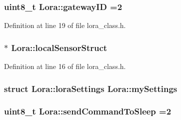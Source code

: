 \subsubsection[{\texorpdfstring{gateway\+ID}{gatewayID}}]{\setlength{\rightskip}{0pt plus 5cm}uint8\+\_\+t Lora\+::gateway\+ID =2\hspace{0.3cm}{\ttfamily [private]}}\hypertarget{class_lora_a47c7dd9636e2680b188e6b475602a049}{}\label{class_lora_a47c7dd9636e2680b188e6b475602a049}


Definition at line 19 of file lora\+\_\+class.\+h.

\subsubsection[{\texorpdfstring{local\+Sensor\+Struct}{localSensorStruct}}]{$\ast$ Lora\+::local\+Sensor\+Struct\hspace{0.3cm}{\ttfamily [private]}}\hypertarget{class_lora_a699a6c2d05a24bb1dd2994b82e9e8a33}{}\label{class_lora_a699a6c2d05a24bb1dd2994b82e9e8a33}


Definition at line 16 of file lora\+\_\+class.\+h.

\subsubsection[{\texorpdfstring{my\+Settings}{mySettings}}]{\setlength{\rightskip}{0pt plus 5cm}struct {\bf Lora\+::lora\+Settings} Lora\+::my\+Settings}\hypertarget{class_lora_aafc57260071b0df449fbe0b63bf55530}{}\label{class_lora_aafc57260071b0df449fbe0b63bf55530}
\subsubsection[{\texorpdfstring{send\+Command\+To\+Sleep}{sendCommandToSleep}}]{\setlength{\rightskip}{0pt plus 5cm}uint8\+\_\+t Lora\+::send\+Command\+To\+Sleep =2\hspace{0.3cm}{\ttfamily [private]}}\hypertarget{class_lora_af6ad33ed00480cffccef545888c53246}{}\label{class_lora_af6ad33ed00480cffccef545888c53246}


